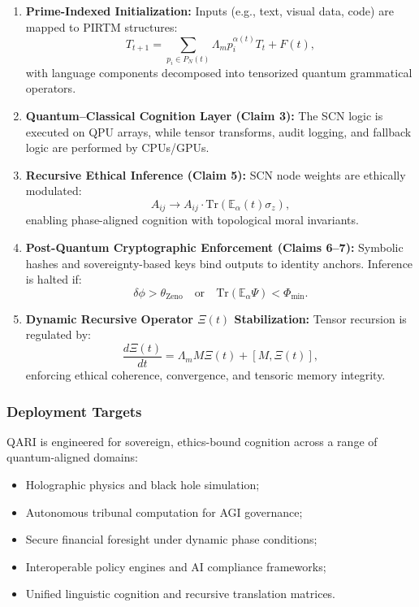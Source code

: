 \documentclass[12pt]{article}
\begin{document}
\begin{enumerate}
    \item \textbf{Prime-Indexed Initialization:}  
    Inputs (e.g., text, visual data, code) are mapped to PIRTM structures:
    \[
    T_{t+1} = \sum_{p_i \in P_N(t)} \Lambda_m p_i^{\alpha(t)} T_t + F(t),
    \]
    with language components decomposed into tensorized quantum grammatical operators.

    \item \textbf{Quantum–Classical Cognition Layer (Claim 3):}  
    The SCN logic is executed on QPU arrays, while tensor transforms, audit logging, and fallback logic are performed by CPUs/GPUs. 

    \item \textbf{Recursive Ethical Inference (Claim 5):}  
    SCN node weights are ethically modulated:
    \[
    A_{ij} \rightarrow A_{ij} \cdot \text{Tr}(\mathbb{E}_\alpha(t) \sigma_z),
    \]
    enabling phase-aligned cognition with topological moral invariants.

    \item \textbf{Post-Quantum Cryptographic Enforcement (Claims 6–7):}  
    Symbolic hashes and sovereignty-based keys bind outputs to identity anchors. Inference is halted if:
    \[
    \delta\phi > \theta_{\text{Zeno}} \quad \text{or} \quad \text{Tr}(\mathbb{E}_\alpha \Psi) < \Phi_{\text{min}}.
    \]

    \item \textbf{Dynamic Recursive Operator \( \Xi(t) \) Stabilization:}  
    Tensor recursion is regulated by:
    \[
    \frac{d\Xi(t)}{dt} = \Lambda_m M \Xi(t) + [M, \Xi(t)],
    \]
    enforcing ethical coherence, convergence, and tensoric memory integrity.
\end{enumerate}

\subsubsection*{Deployment Targets}

QARI is engineered for sovereign, ethics-bound cognition across a range of quantum-aligned domains:
\begin{itemize}
    \item Holographic physics and black hole simulation;
    \item Autonomous tribunal computation for AGI governance;
    \item Secure financial foresight under dynamic phase conditions;
    \item Interoperable policy engines and AI compliance frameworks;
    \item Unified linguistic cognition and recursive translation matrices.
\end{itemize}
\end{document}
